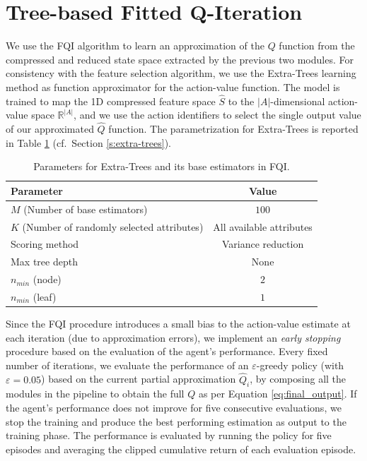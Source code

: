 \section{Tree-based Fitted Q-Iteration}
We use the FQI algorithm to learn an approximation of the $Q$ function from the
compressed and reduced state space extracted by the previous two modules. 
For consistency with the feature selection algorithm, we use the Extra-Trees 
learning method as function approximator for the action-value function.
The model is trained to map the 1D compressed feature space $\hat{S}$ to the 
$|A|$-dimensional action-value space $\mathbb{R}^{|A|}$, and we use the action 
identifiers to select the single output value of our approximated $\hat{Q}$ 
function. 
The parametrization for Extra-Trees is reported in Table \ref{t:FQI_tree_params}
(cf.\ Section \ref{s:extra-trees}).
%
\begin{table}	
    \centering
    \begin{tabular}{l c} 
	\hline
	Parameter                                    & Value                    \\ 
	\hline 
	$M$ (Number of base estimators)              & $100$                    \\
	$K$ (Number of randomly selected attributes) & All available attributes \\
	\hline
	Scoring method                               & Variance reduction       \\
	Max tree depth                               & None                     \\
	$n_{min}$ (node)                             & $2$                      \\
	$n_{min}$ (leaf)                             & $1$                      \\
	\hline
    \end{tabular}
    \caption[Parameters for Extra-Trees (FQI)]{Parameters for Extra-Trees and
	    its base estimators in FQI.}
    \label{t:FQI_tree_params}
\end{table}
%

Since the FQI procedure introduces a small bias to the action-value estimate at 
each iteration (due to approximation errors), we implement an \textit{early 
stopping} procedure based on the evaluation of the agent's performance.
Every fixed number of iterations, we evaluate the performance of an 
$\varepsilon$-greedy policy (with $\varepsilon = 0.05$) based on the current 
partial approximation $\hat{Q}_i$, by composing all the modules in the pipeline 
to obtain the full $Q$ as per Equation \eqref{eq:final_output}. 
If the agent's performance does not improve for five consecutive evaluations, we 
stop the training and produce the best performing estimation as output to the 
training phase.
The performance is evaluated by running the policy for five episodes and 
averaging the clipped cumulative return of each evaluation episode. 

